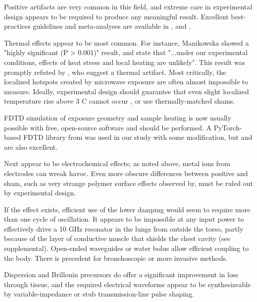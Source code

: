 \documentclass[paper.tex]{subfiles}
\begin{document}
\begin{multicols}{1}
Positive artifacts are very common in this field, and extreme care in experimental design appears to be required to produce any meaningful result. Excellent best-practices guidelines and meta-analyses are available in \cite{Biological2016} \cite{Comprehensive2018} \cite{Funding2019}, \cite{chou1996radio} and \cite{Effects2016}.

Thermal effects appear to be most common. For instance, Manikowska\cite{Effects1985a} showed a "highly significant (P > 0.001)" result, and state that "...under our experimental conditions, effects of heat stress and local heating are unlikely". This result was promptly refuted by \cite{Cytogenetic1986}, who suggest a thermal artifact. Most critically, the localized hotspots created by microwave exposure are often almost impossible to measure. Ideally, experimental design should guarantee that even slight localized temperature rise above 3 C cannot occur \cite{Sharp1983}\cite{Effects1951}\cite{DNA2004}, or use thermally-matched shams\cite{Basic1983}.

FDTD simulation of exposure geometry and sample heating is now usually possible with free, open-source software and should be performed. A PyTorch-based FDTD library from \cite{Highly2019} was used in our study with some modification, but \cite{CUDAbased2019} and \cite{openEMS} are also excellent. 

Next appear to be electrochemical\cite{Comparative2003} effects; as noted above, metal ions from electrodes can wreak havoc. Even more obscure differences between positive and sham, such as very strange polymer surface effects observed by\cite{Effect1994a}, must be ruled out by experimental design.

If the effect exists, efficient use of the lower damping would seem to require more than one cycle of oscillation. It appears to be impossible at any input power to effectively drive a 10 GHz resonator in the lungs from outside the torso, partly because of the layer of conductive muscle that shields the chest cavity (see supplemental). Open-ended waveguides\cite{OpenEnded1982}\cite{Analysis1989}\cite{142018} or water bolus allow efficient coupling to the body. There is precedent for bronchoscopic \cite{Flexible2019}\cite{Antenna2018} or more invasive methods\cite{Implantable1980}\cite{Implantable1982}\cite{Electromagnetic1983}. 

Dispersion and Brillouin precursors do offer a significant improvement in loss through tissue, and the required electrical waveforms appear to be synthesizeable by variable-impedance or stub transmission-line pulse shaping\cite{Coaxial1985}\cite{Arbitrarya}. 


\end{multicols}
\end{document}
